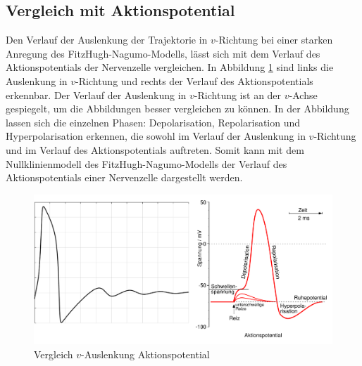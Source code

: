 \begin{refsection}
\subsection{Vergleich mit Aktionspotential}
Den Verlauf der Auslenkung der Trajektorie in $v$-Richtung bei einer starken Anregung des FitzHugh-Nagumo-Modells, lässt
sich mit dem Verlauf des Aktionspotentials der Nervenzelle vergleichen. 
In Abbildung \ref{fig:Vergleich} sind links die Auslenkung in $v$-Richtung und rechts der Verlauf des Aktionspotentials
erkennbar.
Der Verlauf der Auslenkung in $v$-Richtung ist an der $v$-Achse gespiegelt, um die Abbildungen besser vergleichen zu können.
In der Abbildung lassen sich die einzelnen Phasen: Depolarisation, Repolarisation und Hyperpolarisation erkennen, die
sowohl im Verlauf der Auslenkung in $v$-Richtung und im Verlauf des Aktionspotentials auftreten.
Somit kann mit dem Nullklinienmodell des FitzHugh-Nagumo-Modells der Verlauf des Aktionspotentials einer Nervenzelle
dargestellt werden.
\begin{figure}[h]
    \centering
    \includegraphics[width=\textwidth]{papers/nerven/Bilder/Vergleich.png}
    \caption{Vergleich $v$-Auslenkung Aktionspotential}
    \label{fig:Vergleich}
\end{figure}
\cite{nerven:InaLammers.31.08.2015}
\printbibliography[heading=subbibliography]
\end{refsection}